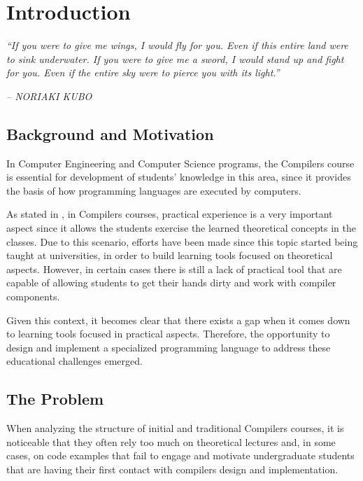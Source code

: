 \chapter{Introduction} \label{cap:introduction}

\begin{displayquote}
    \begin{center}
        \textit{``If you were to give me wings, I would fly for you. Even if this entire land were to sink underwater. If you were to give me a sword, I would stand up and fight for you. Even if the entire sky were to pierce you with its light.''}
    \end{center}
\end{displayquote}

\begin{flushright}
   \textit{-- NORIAKI KUBO}
\end{flushright}

\section{Background and Motivation}
In Computer Engineering and Computer Science programs, the Compilers course is essential for development of students' knowledge in this area, since it provides the basis of how programming languages are executed by computers.

As stated in \cite{aho2008teaching}, in Compilers courses, practical experience is a very important aspect since it allows the students exercise the learned theoretical concepts in the classes. Due to this scenario, efforts have been made since this topic started being taught at universities, in order to build learning tools focused on theoretical aspects. However, in certain cases there is still a lack of practical tool that are capable of allowing students to get their hands dirty and work with compiler components.

Given this context, it becomes clear that there exists a gap when it comes down to learning tools focused in practical aspects. Therefore, the opportunity to design and implement a specialized programming language to address these educational challenges emerged.

\section{The Problem}
When analyzing the structure of initial and traditional Compilers courses, it is noticeable that they often rely too much on theoretical lectures and, in some cases, on code examples that fail to engage and motivate undergraduate students that are having their first contact with compilers design and implementation.

